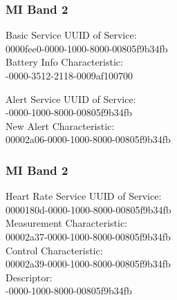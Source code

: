 \documentclass[UTF8]{ctexbeamer}
\begin{document}
\begin{frame}
  \frametitle{MI Band 2}
  \begin{block}{Basic Service}
    UUID of Service: \\{\Monaco 0000fee0-0000-1000-8000-00805f9b34fb} \\
    Battery Info Characteristic: \\{-0000-3512-2118-0009af100700}
  \end{block}
  \begin{block}{Alert Service}
    UUID of Service: \\{-0000-1000-8000-00805f9b34fb} \\
    New Alert Characteristic: \\{\Monaco 00002a06-0000-1000-8000-00805f9b34fb}
  \end{block}
\end{frame}

\begin{frame}
  \frametitle{MI Band 2}
  \begin{block}{Heart Rate Service}
    UUID of Service: \\{\Monaco 0000180d-0000-1000-8000-00805f9b34fb} \\
    Measurement Characteristic: \\{\Monaco 00002a37-0000-1000-8000-00805f9b34fb} \\
    Control Characteristic: \\{\Monaco 00002a39-0000-1000-8000-00805f9b34fb} \\
    Descriptor: \\{-0000-1000-8000-00805f9b34fb} 
  \end{block}
\end{frame}
\end{document}
